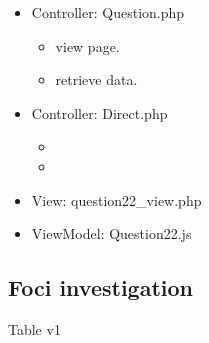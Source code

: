 \documentclass[letterpaper,10pt,english,openany,oneside]{sphinxmanual}
\begin{document}
\begin{sphinxVerbatim}[commandchars=\\\{\}]
               
  
               
\end{sphinxVerbatim}
\begin{itemize}
\item {} 
\sphinxAtStartPar
Controller: Question.php
\begin{itemize}
\item {} 
\sphinxAtStartPar
{} view page.

\item {} 
\sphinxAtStartPar
{} retrieve data.

\end{itemize}

\item {} 
\sphinxAtStartPar
Controller: Direct.php
\begin{itemize}
\item {} 
\sphinxAtStartPar
{}

\item {} 
\sphinxAtStartPar
{}

\end{itemize}

\item {} 
\sphinxAtStartPar
View: question22\_view.php

\item {} 
\sphinxAtStartPar
ViewModel: Question22.js

\end{itemize}


\subsection{Foci investigation}
\label{\detokenize{module/module:foci-investigation}}
\sphinxAtStartPar
Table v1
\end{document}
